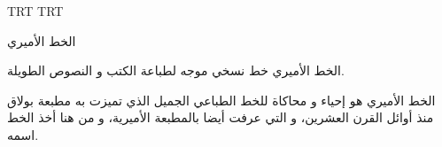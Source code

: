 \documentclass{article}
\begin{document}
\arab 
\startharfbuzz
\luatextextdir TRT
\luatexpardir TRT

  الخط الأميري

  الخط الأميري خط نسخي موجه لطباعة الكتب و النصوص الطويلة.

  الخط الأميري هو إحياء و محاكاة للخط الطباعي الجميل الذي تميزت به مطبعة بولاق منذ أوائل القرن العشرين، و التي عرفت أيضا بالمطبعة الأميرية، و من هنا أخذ الخط اسمه.
\end{document}
